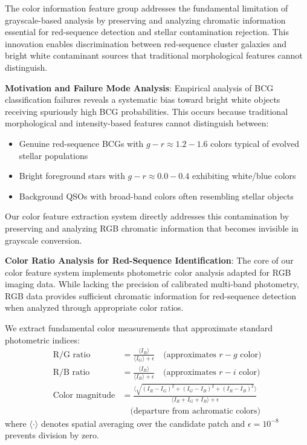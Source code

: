 \documentclass[twocolumn,10pt]{aastex631}
\begin{document}
The color information feature group addresses the fundamental limitation of grayscale-based analysis by preserving and analyzing chromatic information essential for red-sequence detection and stellar contamination rejection. This innovation enables discrimination between red-sequence cluster galaxies and bright white contaminant sources that traditional morphological features cannot distinguish.

\textbf{Motivation and Failure Mode Analysis}: Empirical analysis of BCG classification failures reveals a systematic bias toward bright white objects receiving spuriously high BCG probabilities. This occurs because traditional morphological and intensity-based features cannot distinguish between:
\begin{itemize}
\item Genuine red-sequence BCGs with $g-r \approx 1.2-1.6$ colors typical of evolved stellar populations \citep{Bell2004,Bruzual2003}
\item Bright foreground stars with $g-r \approx 0.0-0.4$ exhibiting white/blue colors
\item Background QSOs with broad-band colors often resembling stellar objects
\end{itemize}

Our color feature extraction system directly addresses this contamination by preserving and analyzing RGB chromatic information that becomes invisible in grayscale conversion.

\textbf{Color Ratio Analysis for Red-Sequence Identification}: The core of our color feature system implements photometric color analysis adapted for RGB imaging data. While lacking the precision of calibrated multi-band photometry, RGB data provides sufficient chromatic information for red-sequence detection when analyzed through appropriate color ratios.

We extract fundamental color measurements that approximate standard photometric indices:
\begin{align}
\text{R/G ratio} &= \frac{\langle I_R \rangle}{\langle I_G \rangle + \epsilon} \quad \text{(approximates } r-g \text{ color)} \\
\text{R/B ratio} &= \frac{\langle I_R \rangle}{\langle I_B \rangle + \epsilon} \quad \text{(approximates } r-i \text{ color)} \\
\text{Color magnitude} &= \frac{\langle\sqrt{(I_R-I_G)^2 + (I_G-I_B)^2 + (I_R-I_B)^2}\rangle}{\langle I_R + I_G + I_B \rangle + \epsilon} \nonumber \\
&\quad \text{(departure from achromatic colors)}
\end{align}
where $\langle \cdot \rangle$ denotes spatial averaging over the candidate patch and $\epsilon = 10^{-8}$ prevents division by zero.
\end{document}
